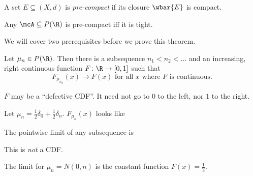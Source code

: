 \begin{definition} \label{def:pre-compact}
    A set $E \subseteq (X, d)$ is \emph{pre-compact} if its closure
    $\wbar{E}$ is compact.
\end{definition}
\begin{theorem*} \label{thm:pre-compact}
    Any $\mcA \subseteq P(\R)$ is pre-compact iff it is tight.
\end{theorem*}
We will cover two prerequisites before we prove this theorem.

\begin{theorem*} \label{thm:helly}
    Let $\mu_n \in P(\R)$.
    Then there is a subsequence $n_1 < n_2 < \dots$ and an increasing,
    right continuous function $F\colon \R \to [0, 1]$ such that \[
        F_{\mu_{n_k}}(x) \to F(x) \text{ for all } x \text{ where } F
            \text{ is continuous.}
    \]
\end{theorem*}
$F$ may be a ``defective CDF''.
It need not go to $0$ to the left, nor $1$ to the right.
\begin{examples}
    \item Let $\mu_n = \frac12 \delta_0 + \frac12 \delta_n$.
        $F_{\mu_n}(x)$ looks like
        \begin{center}
        \end{center}
        The pointwise limit of any subsequence is
        \begin{center}
        \end{center}
        This is \emph{not} a CDF.
    \item The limit for $\mu_n = N(0, n)$ is the constant function
        $F(x) = \frac12$.
\end{examples}

